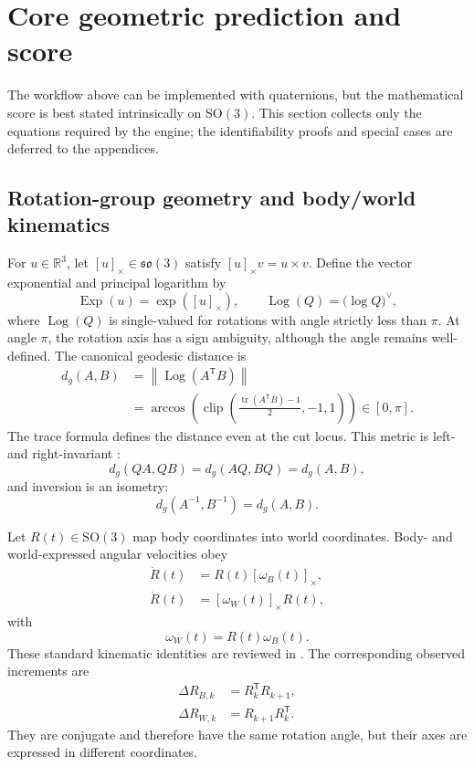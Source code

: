 \documentclass[11pt]{article}
\newcommand{\SO}{\mathrm{SO}(3)}
\newcommand{\so}{\mathfrak{so}(3)}
\newcommand{\R}{\mathbb{R}}
\newcommand{\T}{\mathsf{T}}
\newcommand{\tr}{\operatorname{tr}}
\newcommand{\Exp}{\operatorname{Exp}}
\newcommand{\Log}{\operatorname{Log}}
\newcommand{\clip}{\operatorname{clip}}
\newcommand{\norm}[1]{\left\lVert #1 \right\rVert}
\begin{document}
    \section{Core geometric prediction and score}\label{sec:core-score}

    The workflow above can be implemented with quaternions, but the mathematical score is
    best stated intrinsically on $\SO$. This section collects only the equations required by
    the engine; the identifiability proofs and special cases are deferred to the appendices.

    \subsection{Rotation-group geometry and body/world kinematics}

    For $u\in\R^3$, let $[u]_\times\in\so$ satisfy $[u]_\times v=u\times v$.
    Define the vector exponential and principal logarithm by
    \begin{equation}
        \Exp(u)=\exp([u]_\times),
        \qquad
        \Log(Q)=\bigl(\log Q\bigr)^\vee,
    \end{equation}
    where $\Log(Q)$ is single-valued for rotations with angle strictly less than $\pi$.
    At angle $\pi$, the rotation axis has a sign ambiguity, although the angle remains
    well-defined. The canonical geodesic distance is
    \begin{align}
        d_g(A,B)
        &=\norm{\Log(A^{\T} B)} \nonumber\\
        &=\arccos\!\left(\clip\!\left(\frac{\tr(A^{\T} B)-1}{2},-1,1\right)\right)
        \in[0,\pi].
    \end{align}
    The trace formula defines the distance even at the cut locus. This metric is left- and
    right-invariant \cite{huynh2009}:
    \begin{equation}
        d_g(QA,QB)=d_g(AQ,BQ)=d_g(A,B),
    \end{equation}
    and inversion is an isometry:
    \begin{equation}
        d_g(A^{-1},B^{-1})=d_g(A,B).
    \end{equation}

    Let $R(t)\in\SO$ map body coordinates into world coordinates. Body- and
    world-expressed angular velocities obey
    \begin{align}
        \dot R(t)&=R(t)[\omega_B(t)]_\times, \\
        \dot R(t)&=[\omega_W(t)]_\times R(t),
    \end{align}
    with
    \begin{equation}
        \omega_W(t)=R(t)\omega_B(t).
    \end{equation}
    These standard kinematic identities are reviewed in \cite{barfoot2017,markley2014}.
    The corresponding observed increments are
    \begin{align}
        \Delta R_{B,k}&=R_k^{\T} R_{k+1}, \\
        \Delta R_{W,k}&=R_{k+1}R_k^{\T}.
    \end{align}
    They are conjugate and therefore have the same rotation angle, but their axes are
    expressed in different coordinates.
\end{document}
